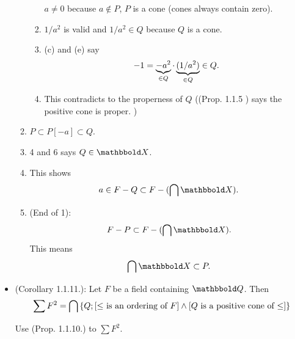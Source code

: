 \documentclass[9pt]{ltjsarticle}
\newcommand{\bbold}{\mathbbold}
\begin{document}
\begin{itemize}
\begin{enumerate}
\begin{enumerate}
      $a\neq 0$ because $a\notin P$, $P$ is a cone (cones always contain zero).
      \item
      $1/a^2$ is valid and $1/a^2 \in Q$ because $Q$ is a cone.
      \item
      (c) and (e) say
      \begin{align}
        -1 = \underbrace{-a^2}_{\in Q} \cdot \underbrace{(1/a^2) }_{\in Q} \in Q.
      \end{align}
      \item
      This contradicts to the properness of $Q$ ((Prop. 1.1.5 ) says the positive cone is proper. )
    \end{enumerate}
    \item
    $P \subset P[-a]\subset Q$.
    \item
    4 and 6 says $Q \in \bbold X$.
    \item
    This shows
    \begin{align}
      a \in F-Q \subset F - (\bigcap \bbold X).
    \end{align}
    \item (End of 1):
    \begin{align}
      F-P \subset F-(\bigcap \bbold X).
    \end{align}
    This means
    \begin{align}
      \bigcap \bbold X \subset P.
    \end{align}

  \end{enumerate}
  \item
  (Corollary 1.1.11.):
  Let $F$ be a field containing $\Q$.
  Then
  \begin{align}
   \sum F^2 = \bigcap {\left\{Q; [\text{$\le$ is an ordering of $F$}] \land [\text{$Q$ is a positive cone of $\le$}]\right\}}
  \end{align}

  \pf
  Use (Prop. 1.1.10.) to $\sum F^2$.

\end{itemize}
\end{document}
